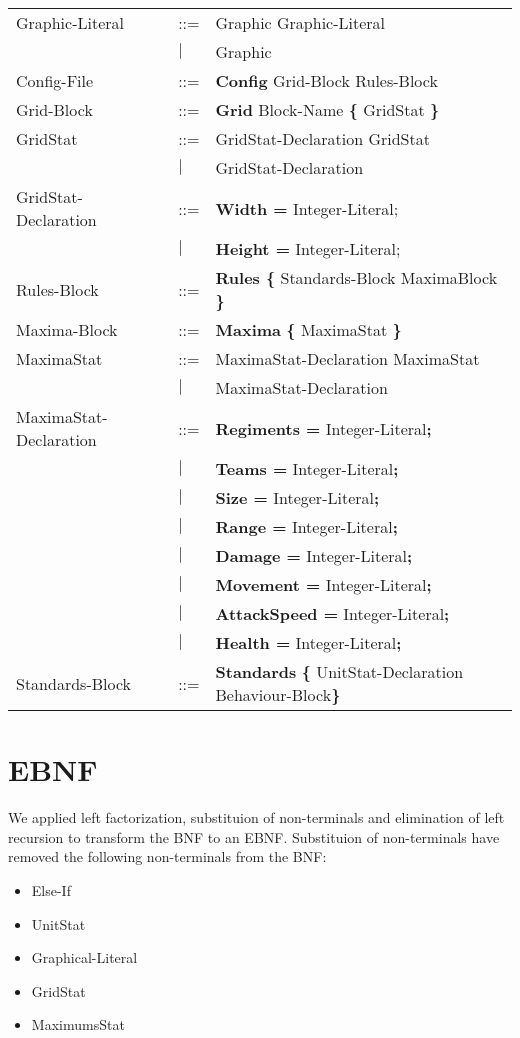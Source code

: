 \begin{center}
\begin{longtable}{l l l}
Graphic-Literal				&	::=	&Graphic Graphic-Literal\\
							&$\mid$	&Graphic\\
Config-File					&	::=	&{\bf Config} Grid-Block Rules-Block\\
Grid-Block					&	::=	&{\bf Grid} Block-Name	 {\bf \{} GridStat \bf{\}}\\
GridStat					&	::=	&GridStat-Declaration GridStat\\
							&$\mid$	&GridStat-Declaration \\
GridStat-Declaration		&	::=	&{\bf Width = } Integer-Literal;\\
							&$\mid$	&{\bf Height = } Integer-Literal;\\
Rules-Block					&	::=	&{\bf Rules \{ } Standards-Block MaximaBlock {\bf \} }\\
Maxima-Block				&	::=	&{\bf Maxima} {\bf \{} MaximaStat {\bf \}} \\
MaximaStat				&	::=		&MaximaStat-Declaration MaximaStat\\
							&$\mid$	&MaximaStat-Declaration\\
MaximaStat-Declaration	&	::=	&{\bf Regiments = } Integer-Literal{\bf ;}\\
							&$\mid$	&{\bf Teams = } Integer-Literal{\bf ;}\\
							&$\mid$	&{\bf Size = } Integer-Literal{\bf ;}\\
							&$\mid$	&{\bf Range = } Integer-Literal{\bf ;}\\
							&$\mid$	&{\bf Damage = } Integer-Literal{\bf ;}\\
							&$\mid$	&{\bf Movement = } Integer-Literal{\bf ;}\\
							&$\mid$	&{\bf AttackSpeed = } Integer-Literal{\bf ;}\\
							&$\mid$	&{\bf Health = } Integer-Literal{\bf ;}\\
Standards-Block				&	::=	&{\bf Standards} {\bf \{ } UnitStat-Declaration Behaviour-Block\bf{\} }\\
\end{longtable}
\end{center}

\chapter{EBNF}
\label{app:ebnf}
	We applied left factorization, substituion of non-terminals 
	and elimination of left recursion  to transform the BNF to an EBNF.
	Substituion of non-terminals have removed the following non-terminals from the BNF: \\
	\begin{itemize}
		\item Else-If
		\item UnitStat
		\item Graphical-Literal
		\item GridStat
		\item MaximumsStat
	\end{itemize}
	
